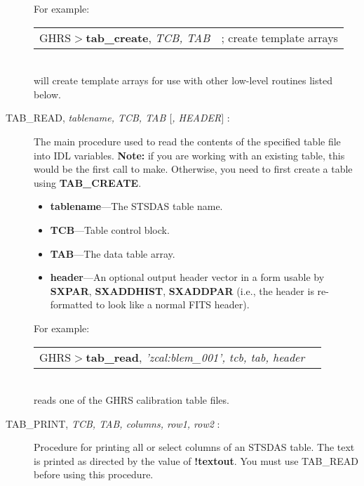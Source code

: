 \begin{description}
\noindent
For example:\\

\begin{tabular}{ll}
GHRS$>${\bf tab\_create}, {\it TCB, TAB} & ; create template arrays\\
\end{tabular}\\

\noindent
will create template arrays for use with other low-level routines listed
below.

\item [TAB\_READ, {\it tablename, TCB, TAB $[$, HEADER$]$} :] 


The main 
procedure used to read the contents of the specified table file into 
IDL variables. {\bf Note:} if you are working with an existing table, this 
would be the first call to make.  Otherwise, you need to first create a 
table using {\bf TAB\_CREATE}.

\begin{itemize}

\item {\bf tablename}---The STSDAS table name.

\item {\bf TCB}---Table control block.

\item {\bf TAB}---The data table array.

\item {\bf header}---An optional output header vector in a form usable 
by {\bf SXPAR}, {\bf SXADDHIST}, {\bf SXADDPAR} 
(i.e., the header is re-formatted to look like a normal FITS header).

\end{itemize}

\noindent
For example:\\

\begin{tabular}{ll}
GHRS$>${\bf tab\_read}, {\it 'zcal:blem\_001', tcb, tab, header} & \\
\end{tabular}\\

\noindent
reads one of the GHRS calibration table files.
%
\item [TAB\_PRINT, {\it TCB, TAB, columns, row1, row2} :]
 
Procedure for printing all or select columns of an STSDAS table.  The
text is printed as directed by the value of {\bf !textout}.  You must 
use TAB\_READ before using this procedure.
 

\end{description}
